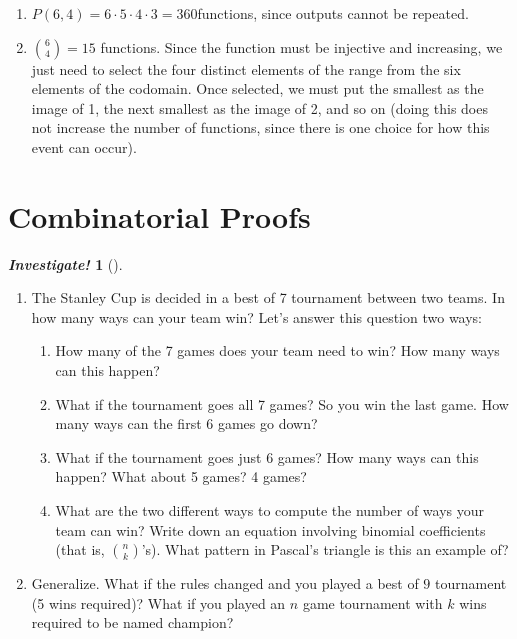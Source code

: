 \documentclass[10pt,]{book}
\theoremstyle{plain}
\theoremstyle{definition}
\theoremstyle{definition}
\newtheorem{investigation}[project]{\emph{Investigate!}}
\theoremstyle{definition}
\numberwithin{equation}{section}
\begin{document}
\begin{exerciselist}
\begin{enumerate}[label=(\alph*)]
\item\hypertarget{li-502}{}\(P(6, 4) = 6 \cdot 5 \cdot 4 \cdot 3 = 360\)functions, since outputs cannot be repeated.%
\item\hypertarget{li-503}{}\({6 \choose 4} = 15\) functions. Since the function must be injective and increasing, we just need to select the four distinct elements of the range from the six elements of the codomain.  Once selected, we must put the smallest as the image of 1, the next smallest as  the image of 2, and so on (doing this does not increase the number of functions, since there is one choice for how this event can occur).  %
\end{enumerate}
\end{exerciselist}
\typeout{************************************************}
\typeout{************************************************}
\section[Combinatorial Proofs]{Combinatorial Proofs}\label{sec_comb-proofs}
\typeout{************************************************}
\typeout{************************************************}
\begin{investigation}[]\label{investigation-9}
\leavevmode%
\begin{enumerate}
\item\hypertarget{li-504}{}
        The Stanley Cup is decided in a best of 7 tournament between two teams. In how many ways can your team win? Let's answer this question two ways:
%
\begin{enumerate}
\item\hypertarget{li-505}{}
        How many of the 7 games does your team need to win?  How many ways can this happen?
\item\hypertarget{li-506}{}
        What if the tournament goes all 7 games?  So you win the last game.  How many ways can the first 6 games go down?
\item\hypertarget{li-507}{}
        What if the tournament goes just 6 games?  How many ways can this happen?  What about 5 games?  4 games?
\item\hypertarget{li-508}{}
        What are the two different ways to compute the number of ways your team can win?  Write down an equation involving binomial coefficients (that is, \({n \choose k}\)'s).  What pattern in Pascal's triangle is this an example of?
\end{enumerate}
\item\hypertarget{li-509}{}
        Generalize. What if the rules changed and you played a best of \(9\) tournament (5 wins required)? What if you played an \(n\) game tournament with \(k\) wins required to be named champion?
\end{enumerate}
\end{investigation}
\typeout{************************************************}
\typeout{************************************************}
\end{document}

